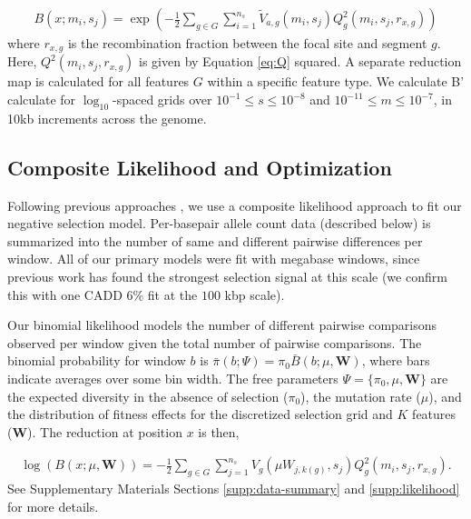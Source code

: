 \documentclass[11pt]{article}
\begin{document}
\begin{align}
    B(x; m_i, s_j) = \exp\left(- \frac{1}{2}\sum_{g \in G} \sum_{i=1}^{n_s} \widetilde{V}_{a,g}(m_i, s_j) Q_g^2(m_i, s_j, r_{x, g})\right)
\end{align}
%
where $r_{x, g}$ is the recombination fraction between the focal site and
segment $g$. Here, $Q^2(m_i, s_j, r_{x,g})$ is given by Equation \eqref{eq:Q}
squared. A separate reduction map is calculated for all features $G$ within a
specific feature type. We calculate B' calculate for $\log_{10}$-spaced grids
over $10^{-1} \le s \le 10^{-8}$ and $10^{-11} \le m \le 10^{-7}$, in 10kb
increments across the genome.

\subsection*{Composite Likelihood and Optimization}
\label{sec:methods-likelihood}

Following previous approaches
\parencite{McVicker2009-ax,Elyashiv2016-vt,Murphy2022-sj}, we use a composite
likelihood approach to fit our negative selection model. Per-basepair allele
count data (described below) is summarized into the number of same and
different pairwise differences per window. All of our primary models were fit
with megabase windows, since previous work has found the strongest selection
signal at this scale (we confirm this with one CADD 6\% fit at the $100$ kbp
scale).

Our binomial likelihood models the number of different pairwise comparisons
observed per window given the total number of pairwise comparisons. The
binomial probability for window $b$ is $\bar{\pi}(b; \Psi) = \pi_0 \bar{B}(b;
\mu, \mathbf{W})$, where bars indicate averages over some bin width. The free
parameters $\Psi = \{\pi_0, \mu, \mathbf{W}\}$ are the expected diversity in
the absence of selection ($\pi_0$), the mutation rate ($\mu$), and the
distribution of fitness effects for the discretized selection grid and $K$
features ($\mathbf{W}$). The reduction at position $x$ is then,

\begin{align}
    \log\left(B(x; \mu, \mathbf{W}) \right) = - \frac{1}{2} \sum_{g \in G} \sum_{j=1}^{n_s} V_g(\mu W_{j, k(g)}, s_j) Q_g^2(m_i, s_j, r_{x, g}).
\end{align}
%
See Supplementary Materials Sections \ref{supp:data-summary} and
\ref{supp:likelihood} for more details.
\end{document}

